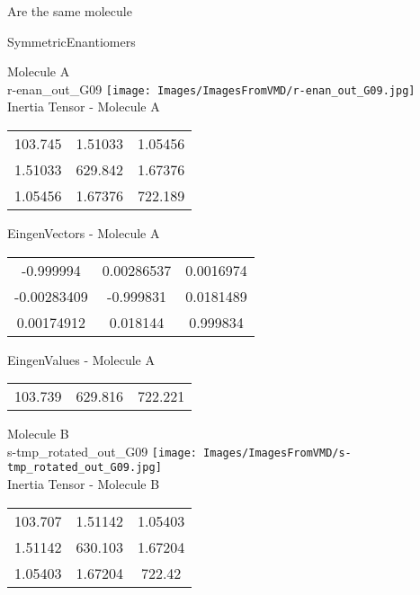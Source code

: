 \begin{center}
\vtab
\vtab
\textcolor{NavyBlue}{\Large Are the same molecule}
\end{center}
\newpage

\vtab[-2cm]
\begin{center}
{\large SymmetricEnantiomers}
\end{center}
\begin{multicols}{2}
\begin{center}
Molecule A \\ 
r-enan\_out\_G09
\texttt{[image: Images/ImagesFromVMD/r-enan\_out\_G09.jpg]}
\\
Inertia Tensor - Molecule A \\
\vtab
\begin{tabular}{|c c c|}
103.745	 & 	1.51033	 & 	1.05456	 \\
1.51033	 & 	629.842	 & 	1.67376	 \\
1.05456	 & 	1.67376	 & 	722.189
\end{tabular}

\vtab
 EingenVectors - Molecule A     \\
\vtab
\begin{tabular}{|c c c|}
-0.999994	 & 	0.00286537	 & 	0.0016974	 \\
-0.00283409	 & 	-0.999831	 & 	0.0181489	 \\
0.00174912	 & 	0.018144	 & 	0.999834
\end{tabular}

\vtab
 EingenValues - Molecule A     \\
\vtab
\begin{tabular}{|c c c|}
103.739	 & 	629.816	 & 	722.221
\end{tabular}
\columnbreak

Molecule B \\ 
s-tmp\_rotated\_out\_G09
\texttt{[image: Images/ImagesFromVMD/s-tmp\_rotated\_out\_G09.jpg]}
\\
Inertia Tensor - Molecule B \\
\vtab
\begin{tabular}{|c c c|}
103.707	 & 	1.51142	 & 	1.05403	 \\
1.51142	 & 	630.103	 & 	1.67204	 \\
1.05403	 & 	1.67204	 & 	722.42
\end{tabular}


\end{center}
\end{multicols}
